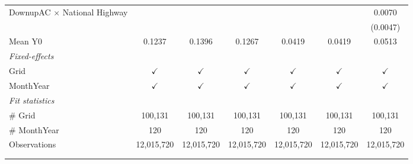 \begin{table}[htbp]
\begin{tabular}{lcccccc}
      DownupAC $\times$ National Highway                         &               &               &               &               &               & 0.0070\\   
                                                                 &               &               &               &               &               & (0.0047)\\   
      \hline Mean Y0                                             & 0.1237        & 0.1396        & 0.1267        & 0.0419        & 0.0419        & 0.0513\\  
      \midrule
      \emph{Fixed-effects}\\
      Grid                                                       & $\checkmark$  & $\checkmark$  & $\checkmark$  & $\checkmark$  & $\checkmark$  & $\checkmark$\\   
      MonthYear                                                  & $\checkmark$  & $\checkmark$  & $\checkmark$  & $\checkmark$  & $\checkmark$  & $\checkmark$\\   
      \midrule
      \emph{Fit statistics}\\
      \# Grid                                                    & 100,131       & 100,131       & 100,131       & 100,131       & 100,131       & 100,131\\  
      \# MonthYear                                               & 120           & 120           & 120           & 120           & 120           & 120\\  
      Observations                                               & 12,015,720    & 12,015,720    & 12,015,720    & 12,015,720    & 12,015,720    & 12,015,720\\  
      \midrule \midrule
                                                                 &               &               &               &               &               &  \tabularnewline 
      \\
   \end{tabular}
\end{table}


